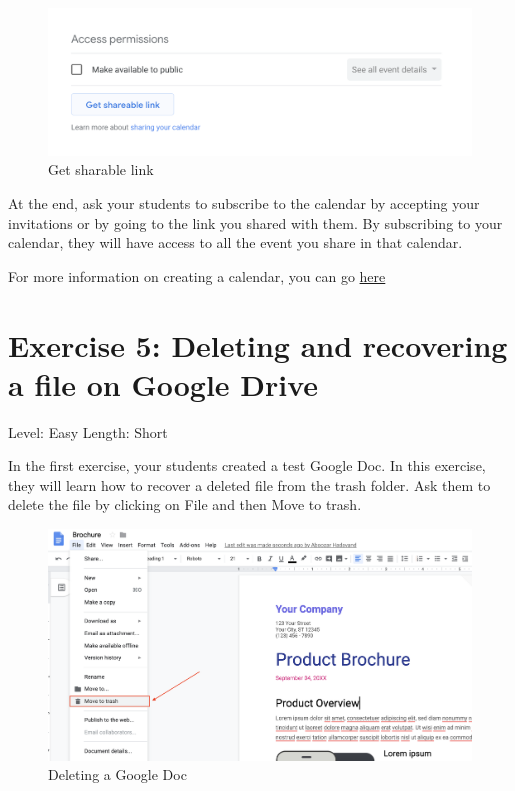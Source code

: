 \documentclass[]{book}
\begin{document}
\begin{figure}
\centering
\includegraphics{./images/gcalendar_sharable_link.png}
\caption{Get sharable link}
\end{figure}

At the end, ask your students to subscribe to the calendar by accepting your invitations or by going to the link you shared with them. By subscribing to your calendar, they will have access to all the event you share in that calendar.

For more information on creating a calendar, you can go \href{https://support.google.com/calendar/answer/37095?hl=en}{here}

\hypertarget{exercise-5-deleting-and-recovering-a-file-on-google-drive}{%
\section*{Exercise 5: Deleting and recovering a file on Google Drive}\label{exercise-5-deleting-and-recovering-a-file-on-google-drive}}

Level: Easy
Length: Short

In the first exercise, your students created a test Google Doc. In this exercise, they will learn how to recover a deleted file from the trash folder. Ask them to delete the file by clicking on File and then Move to trash.

\begin{figure}
\centering
\includegraphics{./images/deleting_files.png}
\caption{Deleting a Google Doc}
\end{figure}
\end{document}
